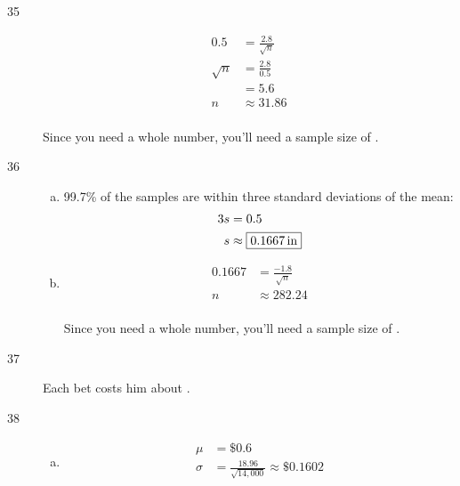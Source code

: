 \documentclass[letterpaper]{exam}
\newcommand{\cent}{\textcent\xspace}
\begin{document}
\begin{description}
      \item[35]
        \begin{align*}
          0.5      & = \frac{2.8}{\sqrt{n}} \\
          \sqrt{n} & = \frac{2.8}{0.5} \\
                   & = 5.6 \\
          n        & \approx 31.86 \\
        \end{align*}

        Since you need a whole number, you'll need a sample size of 
        .

      \item[36]
        \begin{enumerate}[(a)]
          \item 99.7\% of the samples are within three standard deviations of the
            mean:
            \begin{align*}
              3s & = 0.5 \\
              s  & \approx \boxed{ \unit[0.1667]{in} } \\
            \end{align*}

          \item 
            \begin{align*}
              0.1667 & = \frac{-1.8}{\sqrt{n}} \\
              n    & \approx 282.24 \\
            \end{align*}

            Since you need a whole number, you'll need a sample size of 
            .
        \end{enumerate}

      \item[37] Each bet costs him about \fbox{ 40\cent{} }.

      \item[38]
        \begin{enumerate}[(a)]
          \item 
            \begin{align*}
              \mu    & = \boxed{ \$0.6 } \\
              \sigma & = \frac{18.96}{\sqrt{14,000}} \approx \boxed{ \$0.1602 } \\
            \end{align*}
            

\end{enumerate}
\end{description}
\end{document}

